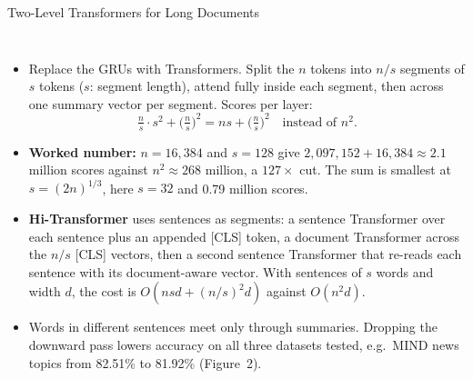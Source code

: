 \begin{frame}{Two-Level Transformers for Long Documents}
  \begin{columns}[T,onlytextwidth]
      \begin{itemize}\footnotesize\itemsep0.25em
        \item[\textcolor{red}{$\blacktriangleright$}] Replace the GRUs with Transformers. Split the $n$ tokens into $n/s$ segments of $s$ tokens ($s$: segment length), attend fully inside each segment, then across one summary vector per segment. Scores per layer:
          \[ \tfrac{n}{s}\cdot s^2 + \big(\tfrac{n}{s}\big)^2 = ns + \big(\tfrac{n}{s}\big)^2 \quad \text{instead of } n^2. \]
        \item[\textcolor{red}{$\blacktriangleright$}] \textbf{Worked number:} $n = 16{,}384$ and $s = 128$ give $2{,}097{,}152 + 16{,}384 \approx 2.1$ million scores against $n^2 \approx 268$ million, a $127\times$ cut. The sum is smallest at $s = (2n)^{1/3}$, here $s = 32$ and 0.79 million scores.
        \item[\textcolor{red}{$\blacktriangleright$}] \textbf{Hi-Transformer} uses sentences as segments: a sentence Transformer over each sentence plus an appended [CLS] token, a document Transformer across the $n/s$ [CLS] vectors, then a second sentence Transformer that re-reads each sentence with its document-aware vector. With sentences of $s$ words and width $d$, the cost is $O(nsd + (n/s)^2 d)$ against $O(n^2 d)$.
        \item[\textcolor{red}{$\blacktriangleright$}] Words in different sentences meet only through summaries. Dropping the downward pass lowers accuracy on all three datasets tested, e.g.\ MIND news topics from 82.51\% to 81.92\% (Figure~2).
      \end{itemize}
      \centering
      \vspace{1.0em}
\end{columns}
\end{frame}
